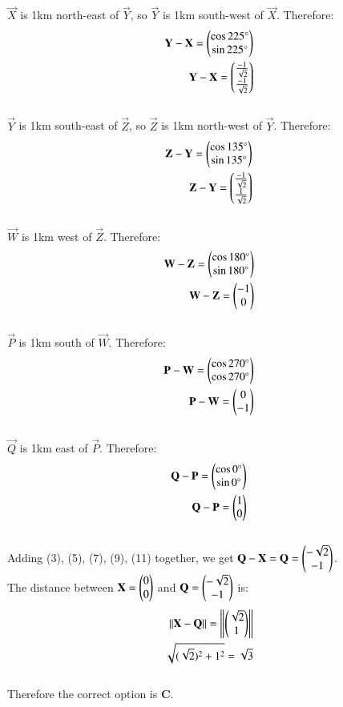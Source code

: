 \documentclass[12pt]{article}
\begin{document}
$\vec{X}$ is 1km north-east of $\vec{Y}$, so $\vec{Y}$ is 1km south-west of $\vec{X}$. Therefore:\begin{align}
\mathbf{Y}-\mathbf{X} = \begin{pmatrix}\cos225\degree \\ \sin225\degree\end{pmatrix}\\
\mathbf{Y}-\mathbf{X} = \begin{pmatrix}\frac{-1}{\sqrt{2}}\\\frac{-1}{\sqrt{2}}\end{pmatrix}
\end{align}\\
$\vec{Y}$ is 1km south-east of $\vec{Z}$, so $\vec{Z}$ is 1km north-west of $\vec{Y}$. Therefore:\begin{align}
\mathbf{Z}-\mathbf{Y} = \begin{pmatrix}\cos135\degree \\ \sin135\degree\end{pmatrix}\\
\mathbf{Z}-\mathbf{Y} = \begin{pmatrix}\frac{-1}{\sqrt{2}}\\\frac{1}{\sqrt{2}}\end{pmatrix}
\end{align}\\
$\vec{W}$ is 1km west of $\vec{Z}$. Therefore:\begin{align}
\mathbf{W}-\mathbf{Z} = \begin{pmatrix}\cos180\degree \\ \sin180\degree\end{pmatrix}\\
\mathbf{W}-\mathbf{Z} = \begin{pmatrix}-1\\0\end{pmatrix}
\end{align}\\
$\vec{P}$ is 1km south of $\vec{W}$. Therefore:\begin{align}
\mathbf{P}-\mathbf{W} = \begin{pmatrix}\cos270\degree \\  \cos270\degree\end{pmatrix}\\
\mathbf{P}-\mathbf{W} = \begin{pmatrix}0\\-1\end{pmatrix}
\end{align}\\
$\vec{Q}$ is 1km east of $\vec{P}$. Therefore:\begin{align}
\mathbf{Q}-\mathbf{P} = \begin{pmatrix}\cos0\degree \\ \sin0\degree\end{pmatrix}\\
\mathbf{Q}-\mathbf{P} = \begin{pmatrix}1\\0\end{pmatrix}
\end{align}\\
Adding (3), (5), (7), (9), (11) together, we get $\mathbf{Q}-\mathbf{X} =\mathbf{Q} = \begin{pmatrix}-\sqrt{2}\\-1\end{pmatrix}$.\\
The distance between $\mathbf{X}=\begin{pmatrix}0\\0\end{pmatrix}$ and $\mathbf{Q}=\begin{pmatrix}-\sqrt{2}\\-1\end{pmatrix}$ is:
\begin{align}
    ||\mathbf{X} - \mathbf{Q}||= \left\lVert\begin{pmatrix}\sqrt{2}\\1\end{pmatrix}\right\rVert \\
    \sqrt{(\sqrt{2})^2 +1^2} = \sqrt{3}
\end{align}\\
Therefore the correct option is \textbf{C}.
\end{document}
